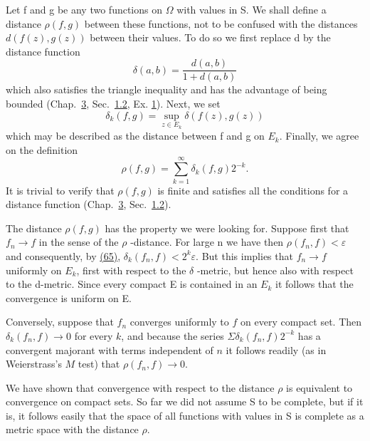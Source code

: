 Let f and g be any two functions on $\Omega$ with values in S. We shall define a distance $\rho(f,g)$ between these functions, not to be confused with the distances $d(f(z),g(z))$ between their values. To do so we first replace d by the distance function
\begin{equation*}
\delta (a, b) = \frac {d (a , b)}{1 + d (a , b)}
\end{equation*}
which also satisfies the triangle inequality and has the advantage of being bounded (Chap.~\hyperref[chap:3]{3}, Sec.~\hyperref[sec:3.1.2]{1.2}, Ex. \hyperref[exercise:3.1.2.1.1]{1}). Next, we set
\begin{equation*}
\delta_ {k} (f, g) = \sup _ {z \in E _ {k}} \delta (f (z), g (z))
\end{equation*}
which may be described as the distance between f and g on $E_{k}$. Finally, we agree on the definition
\begin{equation*}
\rho (f, g) = \sum_ {k = 1} ^ {\infty} \delta_ {k} (f, g) 2 ^ {- k}.\tag{65}\label{eq:5.65}
\end{equation*}
It is trivial to verify that $\rho(f,g)$ is finite and satisfies all the conditions for a distance function (Chap.~\hyperref[chap:3]{3}, Sec.~\hyperref[sec:3.1.2]{1.2}).


The distance $\rho(f,g)$ has the property we were looking for. Suppose first that $f_{n}\to f$ in the sense of the $\rho$ -distance. For large n we have then $\rho(f_{n},f)<\varepsilon$ and consequently, by \hyperref[eq:5.65]{(65)}, $\delta_{k}(f_{n},f)<2^{k}\varepsilon$. But this implies that $f_{n}\to f$ uniformly on $E_{k}$, first with respect to the $\delta$ -metric, but hence also with respect to the d-metric. Since every compact E is contained in an $E_{k}$ it follows that the convergence is uniform on E.

Conversely, suppose that $f_{n}$ converges uniformly to $f$ on every compact set. Then $\delta_k(f_n,f) \to 0$ for every $k$, and because the series $\Sigma \delta_k(f_n,f)2^{-k}$ has a convergent majorant with terms independent of $n$ it follows readily (as in Weierstrass's $M$ test) that $\rho(f_n,f) \to 0$.

We have shown that convergence with respect to the distance $\rho$ is equivalent to convergence on compact sets. So far we did not assume S to be complete, but if it is, it follows easily that the space of all functions with values in S is complete as a metric space with the distance $\rho$.

